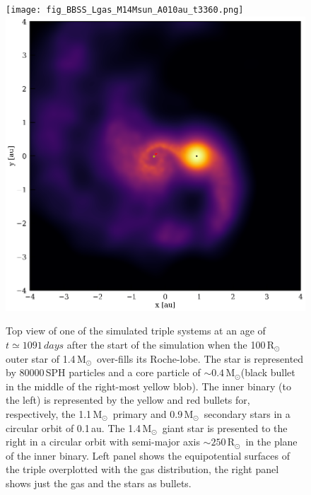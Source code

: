 \documentclass[twocolumn]{aastex62}
\newcommand{\MSun}{\mbox{M$_\odot$}}
\newcommand{\RSun}{\mbox{R$_\odot$}}
\begin{document}
\begin{figure}[ht!]
  \texttt{[image: fig\_BBSS\_Lgas\_M14Msun\_A010au\_t3360.png]}
~  \includegraphics[width=0.5\linewidth]{fig_BBSS_gas_M14Msun_A010au_t3360.png}
  \caption{ Top view of one of the simulated triple systems at an age
    of $t \simeq 1091\,days$ after the start of the simulation when
    the 100\,\RSun\, outer star of 1.4\,\MSun\, over-fills its
    Roche-lobe.  The star is represented by 80000\,SPH particles and a
    core particle of $\sim 0.4$\,\MSun (black bullet in the middle of
    the right-most yellow blob). The inner binary (to the
      left) is represented by the yellow and red bullets for,
    respectively, the 1.1\,\MSun\, primary and 0.9\,\MSun\, secondary
    stars in a circular orbit of 0.1\,au. The 1.4\,\MSun\, giant star
    is presented to the right in a circular orbit with semi-major axis
    $\sim 250$\,\RSun\, in the plane of the inner binary.  Left panel
    shows the equipotential surfaces of the triple overplotted with
    the gas distribution, the right panel shows just the gas and the
    stars as bullets.
\label{fig:topview_at_t1000day}}
\end{figure}
\end{document}
